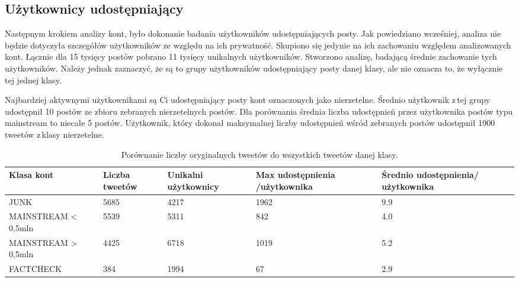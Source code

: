 \subsection{Użytkownicy udostępniający}
Następnym krokiem analizy kont, było dokonanie badania użytkowników udostępniających posty. Jak powiedziano wcześniej, analiza nie będzie dotyczyła szczegółów użytkowników ze względu na ich prywatność. Skupiono się jedynie na ich zachowaniu względem analizowanych kont. Łącznie dla 15 tysięcy postów pobrano 11 tysięcy unikalnych użytkowników. Stworzono analizę, badającą średnie zachowanie tych użytkowników. Należy jednak zaznaczyć, że są to grupy użytkowników udostępniający posty danej klasy, ale nie oznacza to, że wyłącznie tej jednej klasy. 
\par
Najbardziej aktywnymi użytkownikami są Ci udostępniający posty kont oznaczonych jako nierzetelne. Średnio użytkownik z\,tej grupy udostępnił 10 postów ze zbioru zebranych nierzetelnych postów. Dla porównania średnia liczba udostępnień przez użytkownika postów typu mainstream to niecałe 5 postów.  Użytkownik, który dokonał maksymalnej liczby udostępnień wśród zebranych postów udostępnił 1900 tweetów z\,klasy nierzetelne. 


\begin{table}[!h]
\centering 
\caption{Porównanie liczby oryginalnych tweetów do wszystkich tweetów danej klasy.} \label{tab:liczbaretweeterow}
\begin{tabular}{|m{}|R{2,5cm}|R{2,5cm}|R{2,5cm}|R{2,5cm}|} 
\hline
Klasa kont & Liczba tweetów & Unikalni użytkownicy & Max udostępnienia /użytkownika & Średnio udostępnienia/ użytkownika \\ 
\hline
JUNK & 5685 & 4217 & 1962 & 9.9 \\ 
\hline
MAINSTREAM \textless{} 0,5mln & 5539 & 5311 & 842 & 4.0 \\ 
\hline
MAINSTREAM \textgreater{} 0,5mln & 4425 & 6718 & 1019 & 5.2 \\ 
\hline
FACTCHECK & 384 & 1994 & 67 & 2.9 \\
\hline
\end{tabular}
\end{table}

